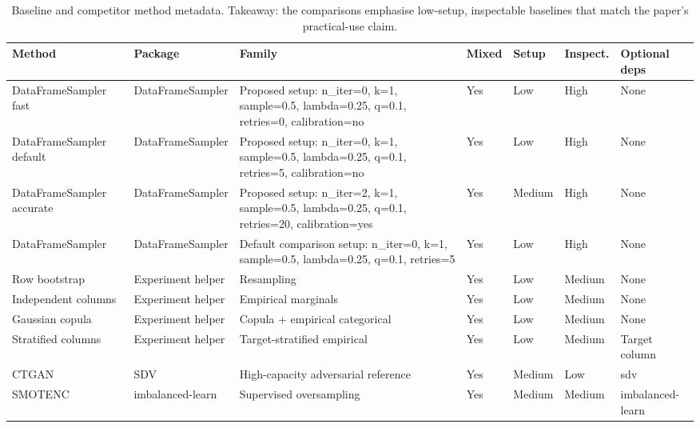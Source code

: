 \begin{table}
\caption{Baseline and competitor method metadata. Takeaway: the comparisons emphasise low-setup, inspectable baselines that match the paper's practical-use claim.}
\label{tab:methods}
\begin{adjustbox}{max width=\textwidth}
\begin{tabular}{lllllll}
\toprule
Method & Package & Family & Mixed & Setup & Inspect. & Optional deps \\
\midrule
DataFrameSampler fast & DataFrameSampler & Proposed setup: n\_iter=0, k=1, sample=0.5, lambda=0.25, q=0.1, retries=0, calibration=no & Yes & Low & High & None \\
DataFrameSampler default & DataFrameSampler & Proposed setup: n\_iter=0, k=1, sample=0.5, lambda=0.25, q=0.1, retries=5, calibration=no & Yes & Low & High & None \\
DataFrameSampler accurate & DataFrameSampler & Proposed setup: n\_iter=2, k=1, sample=0.5, lambda=0.25, q=0.1, retries=20, calibration=yes & Yes & Medium & High & None \\
DataFrameSampler & DataFrameSampler & Default comparison setup: n\_iter=0, k=1, sample=0.5, lambda=0.25, q=0.1, retries=5 & Yes & Low & High & None \\
Row bootstrap & Experiment helper & Resampling & Yes & Low & Medium & None \\
Independent columns & Experiment helper & Empirical marginals & Yes & Low & Medium & None \\
Gaussian copula & Experiment helper & Copula + empirical categorical & Yes & Low & Medium & None \\
Stratified columns & Experiment helper & Target-stratified empirical & Yes & Low & Medium & Target column \\
CTGAN & SDV & High-capacity adversarial reference & Yes & Medium & Low & sdv \\
SMOTENC & imbalanced-learn & Supervised oversampling & Yes & Medium & Medium & imbalanced-learn \\
\bottomrule
\end{tabular}
\end{adjustbox}
\end{table}
